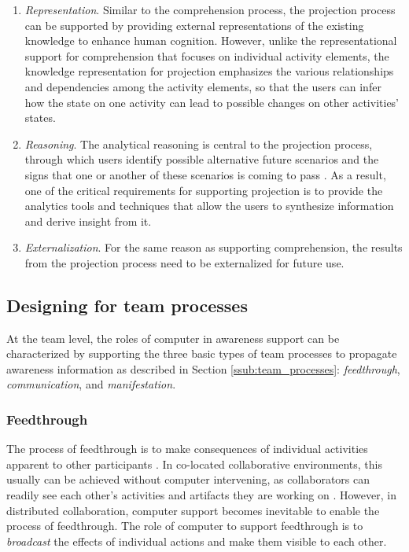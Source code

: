 \begin{enumerate}
	\item \emph{Representation}. Similar to the comprehension process, the projection process can be supported by providing external representations of the existing knowledge to enhance human cognition. However, unlike the representational support for comprehension that focuses on individual activity elements, the knowledge representation for projection emphasizes the various relationships and dependencies among the activity elements, so that the users can infer how the state on one activity can lead to possible changes on other activities' states.
	\item \emph{Reasoning}. The analytical reasoning is central to the projection process, through which users identify possible alternative future scenarios and the signs that one or another of these scenarios is coming to pass \cite{Thomas2006}. As a result, one of the critical requirements for supporting projection is to provide the analytics tools and techniques that allow the users to synthesize information and derive insight from it.
	\item \emph{Externalization}. For the same reason as supporting comprehension, the results from the projection process need to be externalized for future use. 
\end{enumerate}


\subsection{Designing for team processes} %
\label{sub:designing_for_the_team}
At the team level, the roles of computer in awareness support can be characterized by supporting the three basic types of team processes to propagate awareness information as described in Section \ref{ssub:team_processes}: \emph{feedthrough}, \emph{communication}, and \emph{manifestation}.

\subsubsection*{Feedthrough} %
\label{ssub:feedthrough}
The process of feedthrough is to make consequences of individual activities apparent to other participants \cite{dourish1992awareness}. In co-located collaborative environments, this usually can be achieved without computer intervening, as collaborators can readily see each other's activities and artifacts they are working on \cite{schmidt2002a}. However, in distributed collaboration, computer support becomes inevitable to enable the process of feedthrough. The role of computer to support feedthrough is to \emph{broadcast} the effects of individual actions and make them visible to each other.
